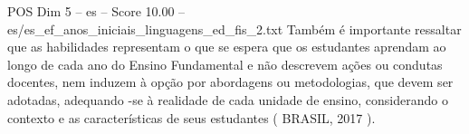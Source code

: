 \begin{textsample}{POS Dim 5 – es – Score 10.00 – es/es\_ef\_anos\_iniciais\_linguagens\_ed\_fis\_2.txt}
Também é importante ressaltar que as habilidades representam o que se espera que os estudantes aprendam ao longo de cada ano do Ensino Fundamental e não descrevem ações ou condutas docentes, nem induzem à opção por abordagens ou metodologias, que devem ser adotadas, adequando -se à realidade de cada unidade de ensino, considerando o contexto e as características de seus estudantes ( BRASIL, 2017 ).

\end{textsample}
